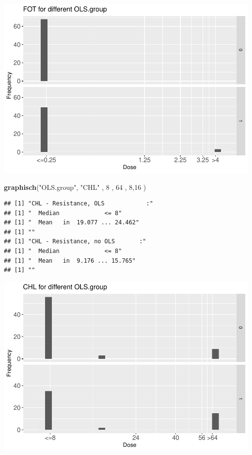 \documentclass[
]{article}
\newenvironment{Shaded}{\begin{snugshade}}{\end{snugshade}}
\newcommand{\DecValTok}[1]{\textcolor[rgb]{0.00,0.00,0.81}{#1}}
\newcommand{\KeywordTok}[1]{\textcolor[rgb]{0.13,0.29,0.53}{\textbf{#1}}}
\newcommand{\NormalTok}[1]{#1}
\newcommand{\StringTok}[1]{\textcolor[rgb]{0.31,0.60,0.02}{#1}}
\begin{document}
\includegraphics{Verteilungen_files/figure-latex/unnamed-chunk-25-1.pdf}

\begin{Shaded}
\begin{Highlighting}[]
  \KeywordTok{graphisch}\NormalTok{(}\StringTok{"OLS.group"}\NormalTok{, }\StringTok{"CHL"}\NormalTok{ , }\DecValTok{8}\NormalTok{    ,  }\DecValTok{64}\NormalTok{   ,   }\DecValTok{8}\NormalTok{,}\DecValTok{16}\NormalTok{    ) }
\end{Highlighting}
\end{Shaded}

\begin{verbatim}
## [1] "CHL - Resistance, OLS            :"
## [1] "  Median             <= 8"
## [1] "  Mean   in  19.077 ... 24.462"
## [1] ""
## [1] "CHL - Resistance, no OLS       :"
## [1] "  Median             <= 8"
## [1] "  Mean   in  9.176 ... 15.765"
## [1] ""
\end{verbatim}

\includegraphics{Verteilungen_files/figure-latex/unnamed-chunk-26-1.pdf}
\end{document}
